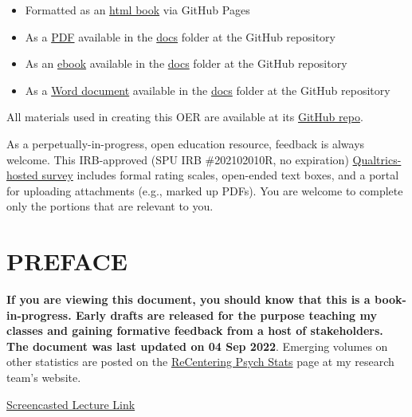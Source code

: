\documentclass[
  11pt,
]{book}
\providecommand{\tightlist}{%
  \setlength{\itemsep}{0pt}\setlength{\parskip}{0pt}}
\begin{document}
\begin{itemize}
\tightlist
\item
  Formatted as an \href{https://lhbikos.github.io/ReCenterPsychStats/}{html book} via GitHub Pages
\item
  As a \href{https://github.com/lhbikos/ReCenterPsychStats/blob/main/docs/ReCenterPsychStats.pdf}{PDF} available in the \href{https://github.com/lhbikos/ReCenterPsychStats/tree/main/docs}{docs} folder at the GitHub repository
\item
  As an \href{https://github.com/lhbikos/ReCenterPsychStats/blob/main/docs/ReCenterPsychStats.epub}{ebook} available in the \href{https://github.com/lhbikos/ReCenterPsychStats/tree/main/docs}{docs} folder at the GitHub repository
\item
  As a \href{https://github.com/lhbikos/ReCenterPsychStats/blob/main/docs/ReCenterPsychStats.docx}{Word document} available in the \href{https://github.com/lhbikos/ReCenterPsychStats/tree/main/docs}{docs} folder at the GitHub repository
\end{itemize}

All materials used in creating this OER are available at its \href{https://github.com/lhbikos/ReCenterPsychStats}{GitHub repo}.

As a perpetually-in-progress, open education resource, feedback is always welcome. This IRB-approved (SPU IRB \#202102010R, no expiration) \href{https://spupsych.az1.qualtrics.com/jfe/form/SV_0OnBLfut3VIOIS2}{Qualtrics-hosted survey} includes formal rating scales, open-ended text boxes, and a portal for uploading attachments (e.g., marked up PDFs). You are welcome to complete only the portions that are relevant to you.

\hypertarget{preface}{%
\chapter*{PREFACE}\label{preface}}

\textbf{If you are viewing this document, you should know that this is a book-in-progress. Early drafts are released for the purpose teaching my classes and gaining formative feedback from a host of stakeholders. The document was last updated on 04 Sep 2022}. Emerging volumes on other statistics are posted on the \href{https://lhbikos.github.io/BikosRVT/ReCenter.html}{ReCentering Psych Stats} page at my research team's website.

\href{https://spu.hosted.panopto.com/Panopto/Pages/Viewer.aspx?id=c932455e-ef06-444a-bdca-acf7012d759a}{Screencasted Lecture Link}
\end{document}

